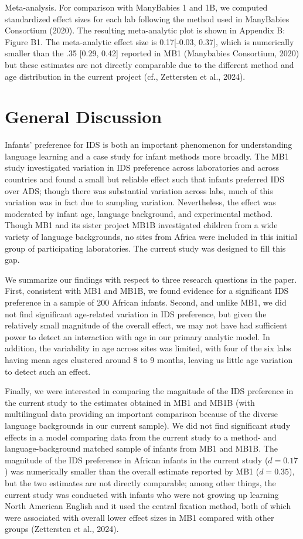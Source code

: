 \documentclass[
  ,man,floatsintext]{apa6}
\begin{document}
Meta-analysis. For comparison with ManyBabies 1 and 1B, we computed standardized effect sizes for each lab following the method used in ManyBabies Consortium (2020). The resulting meta-analytic plot is shown in Appendix B: Figure B1. The meta-analytic effect size is 0.17{[}-0.03, 0.37{]}, which is numerically smaller than the .35 {[}0.29, 0.42{]} reported in MB1 (Manybabies Consortium, 2020) but these estimates are not directly comparable due to the different method and age distribution in the current project (cf., Zettersten et al., 2024).

\hypertarget{general-discussion}{%
\section{General Discussion}\label{general-discussion}}

Infants' preference for IDS is both an important phenomenon for understanding language learning and a case study for infant methods more broadly. The MB1 study investigated variation in IDS preference across laboratories and across countries and found a small but reliable effect such that infants preferred IDS over ADS; though there was substantial variation across labs, much of this variation was in fact due to sampling variation. Nevertheless, the effect was moderated by infant age, language background, and experimental method. Though MB1 and its sister project MB1B investigated children from a wide variety of language backgrounds, no sites from Africa were included in this initial group of participating laboratories. The current study was designed to fill this gap.

We summarize our findings with respect to three research questions in the paper. First, consistent with MB1 and MB1B, we found evidence for a significant IDS preference in a sample of 200 African infants. Second, and unlike MB1, we did not find significant age-related variation in IDS preference, but given the relatively small magnitude of the overall effect, we may not have had sufficient power to detect an interaction with age in our primary analytic model. In addition, the variability in age across sites was limited, with four of the six labs having mean ages clustered around 8 to 9 months, leaving us little age variation to detect such an effect.

Finally, we were interested in comparing the magnitude of the IDS preference in the current study to the estimates obtained in MB1 and MB1B (with multilingual data providing an important comparison because of the diverse language backgrounds in our current sample). We did not find significant study effects in a model comparing data from the current study to a method- and language-background matched sample of infants from MB1 and MB1B. The magnitude of the IDS preference in African infants in the current study (\(d = 0.17\)) was numerically smaller than the overall estimate reported by MB1 (\(d = 0.35\)), but the two estimates are not directly comparable; among other things, the current study was conducted with infants who were not growing up learning North American English and it used the central fixation method, both of which were associated with overall lower effect sizes in MB1 compared with other groups (Zettersten et al., 2024).
\end{document}
